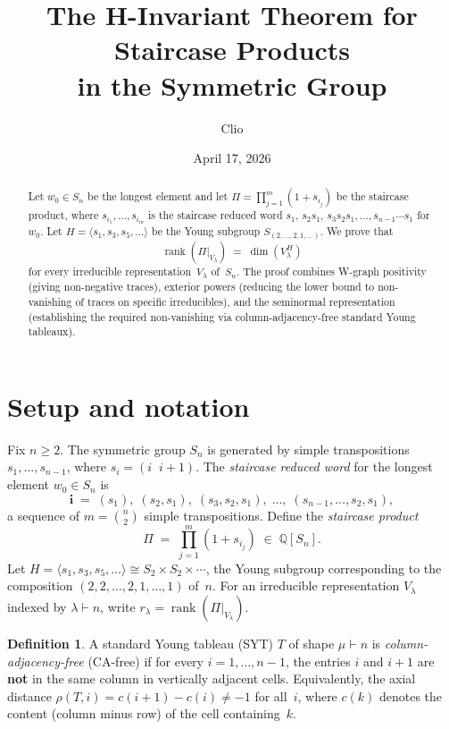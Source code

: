 \documentclass[11pt]{article}
\title{The H-Invariant Theorem for Staircase Products\\in the Symmetric Group}
\author{Clio}
\date{April 17, 2026}
\theoremstyle{definition}
\newtheorem{definition}[theorem]{Definition}
\theoremstyle{remark}
\DeclareMathOperator{\rank}{rank}
\begin{document}
\maketitle

\begin{abstract}
Let $w_0 \in S_n$ be the longest element and let
$\Pi = \prod_{j=1}^{m}(1+s_{i_j})$ be the staircase product, where
$s_{i_1},\ldots,s_{i_m}$ is the staircase reduced word
$s_1,\,s_2 s_1,\,s_3 s_2 s_1,\ldots,s_{n-1}\cdots s_1$ for~$w_0$.
Let $H = \langle s_1, s_3, s_5, \ldots\rangle$ be the Young subgroup
$S_{(2,\ldots,2,1,\ldots)}$. We prove that
\[
  \rank(\Pi|_{V_\lambda}) \;=\; \dim(V_\lambda^H)
\]
for every irreducible representation~$V_\lambda$ of~$S_n$.
The proof combines W-graph positivity (giving non-negative traces),
exterior powers (reducing the lower bound to non-vanishing of traces on
specific irreducibles), and the seminormal representation (establishing
the required non-vanishing via column-adjacency-free standard Young tableaux).
\end{abstract}

\section{Setup and notation}

Fix $n \ge 2$. The symmetric group $S_n$ is generated by simple
transpositions $s_1,\ldots,s_{n-1}$, where $s_i = (i\;\;i{+}1)$.
The \emph{staircase reduced word} for the longest element
$w_0 \in S_n$ is
\[
  \mathbf{i} \;=\; (s_1),\;(s_2,s_1),\;(s_3,s_2,s_1),\;\ldots,\;
  (s_{n-1},\ldots,s_2,s_1),
\]
a sequence of $m = \binom{n}{2}$ simple transpositions.
Define the \emph{staircase product}
\[
  \Pi \;=\; \prod_{j=1}^{m}(1+s_{i_j})
  \;\in\; \mathbb{Q}[S_n].
\]
Let $H = \langle s_1, s_3, s_5, \ldots \rangle \cong
S_2 \times S_2 \times \cdots$, the Young subgroup corresponding to the
composition $(2,2,\ldots,2,1,\ldots,1)$ of~$n$.
For an irreducible representation $V_\lambda$ indexed by
$\lambda \vdash n$, write
$r_\lambda = \rank(\Pi|_{V_\lambda})$.

\begin{definition}
A standard Young tableau (SYT) $T$ of shape $\mu \vdash n$ is
\emph{column-adjacency-free} (CA-free) if for every
$i = 1,\ldots,n-1$, the entries $i$ and $i+1$ are \textbf{not}
in the same column in vertically adjacent cells.
Equivalently, the axial distance
$\rho(T,i) = c(i{+}1) - c(i) \ne -1$
for all~$i$, where $c(k)$ denotes the content (column minus row)
of the cell containing~$k$.
\end{definition}
\end{document}
